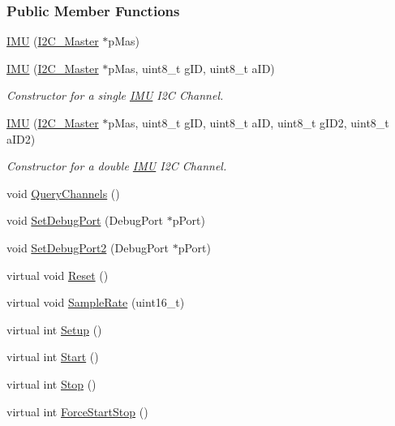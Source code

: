 \subsubsection*{Public Member Functions}
\begin{DoxyCompactItemize}
\item 
\hyperlink{class_i_m_u_ab77a4c6c64f65642c42ebbf55a4e7a1e}{IMU} (\hyperlink{class_i2_c___master}{I2C\_\-Master} $\ast$pMas)
\item 
\hyperlink{class_i_m_u_aa628daa06d0e29e4aa84bb8336649134}{IMU} (\hyperlink{class_i2_c___master}{I2C\_\-Master} $\ast$pMas, uint8\_\-t gID, uint8\_\-t aID)
\begin{DoxyCompactList}\small\item\em Constructor for a single \hyperlink{class_i_m_u}{IMU} I2C Channel. \item\end{DoxyCompactList}\item 
\hyperlink{class_i_m_u_ac3b25bbd72ae020b61012fd4ebf8a188}{IMU} (\hyperlink{class_i2_c___master}{I2C\_\-Master} $\ast$pMas, uint8\_\-t gID, uint8\_\-t aID, uint8\_\-t gID2, uint8\_\-t aID2)
\begin{DoxyCompactList}\small\item\em Constructor for a double \hyperlink{class_i_m_u}{IMU} I2C Channel. \item\end{DoxyCompactList}\item 
void \hyperlink{class_i_m_u_a496602369b71a85051ba0506a8af70a1}{QueryChannels} ()
\item 
void \hyperlink{class_i_m_u_afedf46bdad68cb4002af8bf46530d265}{SetDebugPort} (DebugPort $\ast$pPort)
\item 
void \hyperlink{class_i_m_u_a6f86c79e66c4262093c2d65fe3fee45c}{SetDebugPort2} (DebugPort $\ast$pPort)
\item 
virtual void \hyperlink{class_i_m_u_a13191357ff93d02f6cc7aa7e55b13d67}{Reset} ()
\item 
virtual void \hyperlink{class_i_m_u_a7705d9d642b093a670e78534c9b2d3db}{SampleRate} (uint16\_\-t)
\item 
virtual int \hyperlink{class_i_m_u_a290737d42de965c15c8327edfc516ffd}{Setup} ()
\item 
virtual int \hyperlink{class_i_m_u_a7c03f7a423240538756a62441b298d01}{Start} ()
\item 
virtual int \hyperlink{class_i_m_u_af0841bed4167f7a4eb12c40d7b8e615e}{Stop} ()
\item 
virtual int \hyperlink{class_i_m_u_a004d2bb9e6155f45edc9e46bce730644}{ForceStartStop} ()

\end{DoxyCompactItemize}
